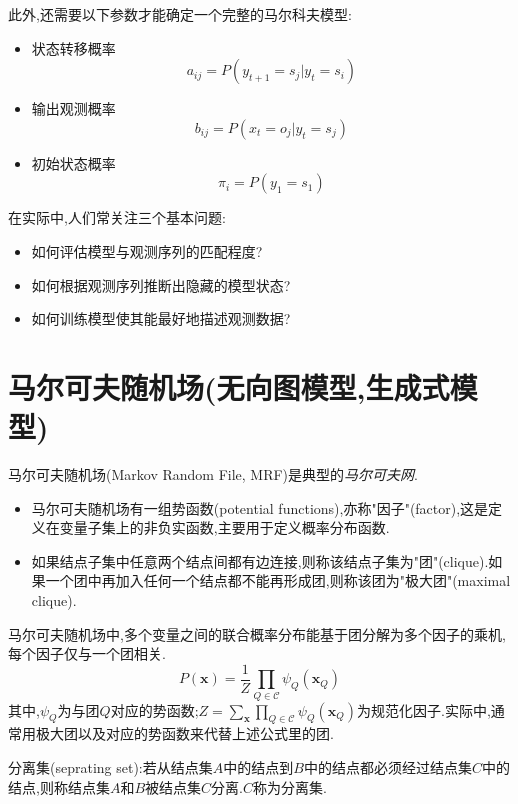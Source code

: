 此外,还需要以下参数才能确定一个完整的马尔科夫模型:
\begin{itemize}
\item 状态转移概率
\begin{equation}
a_{ij}=P(y_{t+1}=s_j|y_t=s_i)
\end{equation}
\item 输出观测概率
\begin{equation}
b_{ij}=P(x_t=o_j|y_t=s_j)
\end{equation}
\item 初始状态概率
\begin{equation}
\pi_i=P(y_1=s_1)
\end{equation}
\end{itemize}

在实际中,人们常关注三个基本问题:
\begin{itemize}
\item 如何评估模型与观测序列的匹配程度?
\item 如何根据观测序列推断出隐藏的模型状态?
\item 如何训练模型使其能最好地描述观测数据?
\end{itemize}

\section{马尔可夫随机场(无向图模型,生成式模型)}

马尔可夫随机场(Markov Random File, MRF)是典型的\textit{马尔可夫网}.
\begin{itemize}
\item 马尔可夫随机场有一组势函数(potential functions),亦称"因子"(factor),这是定义在变量子集上的非负实函数,主要用于定义概率分布函数.
\item 如果结点子集中任意两个结点间都有边连接,则称该结点子集为"团"(clique).如果一个团中再加入任何一个结点都不能再形成团,则称该团为"极大团"(maximal clique).
\end{itemize}

马尔可夫随机场中,多个变量之间的联合概率分布能基于团分解为多个因子的乘机,每个因子仅与一个团相关.
\begin{equation}
P(\mathbf x)=\frac{1}{Z}\prod_{Q\in\mathcal C}\psi_Q(\mathbf x_Q)
\end{equation}
其中,$\psi_Q$为与团$Q$对应的势函数;$Z=\sum_{\mathbf x}\prod_{Q\in\mathcal C}\psi_Q(\mathbf x_Q)$为规范化因子.实际中,通常用极大团以及对应的势函数来代替上述公式里的团.

分离集(seprating set):若从结点集$A$中的结点到$B$中的结点都必须经过结点集$C$中的结点,则称结点集$A$和$B$被结点集$C$分离.$C$称为分离集.

